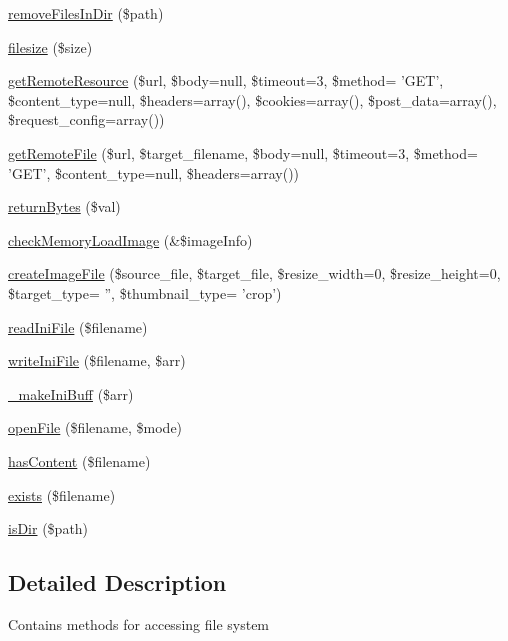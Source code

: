 \begin{DoxyCompactItemize}
\hyperlink{classFileHandler_a07839b4971e9ef40039d23ea65977d69}{remove\+Files\+In\+Dir} (\$path)
\item 
\hyperlink{classFileHandler_ae235b4ded589fb13caed260fabc0a30c}{filesize} (\$size)
\item 
\hyperlink{classFileHandler_a602c039b415c15d9d6866e586282faf7}{get\+Remote\+Resource} (\$url, \$body=null, \$timeout=3, \$method= 'G\+E\+T', \$content\+\_\+type=null, \$headers=array(), \$cookies=array(), \$post\+\_\+data=array(), \$request\+\_\+config=array())
\item 
\hyperlink{classFileHandler_a41e633e2f59cffddd5d5ffae1e3639c7}{get\+Remote\+File} (\$url, \$target\+\_\+filename, \$body=null, \$timeout=3, \$method= 'G\+E\+T', \$content\+\_\+type=null, \$headers=array())
\item 
\hyperlink{classFileHandler_a79dd068137470965b560f4d23d978e7d}{return\+Bytes} (\$val)
\item 
\hyperlink{classFileHandler_a0b240e89b6ce57cb94e855fc25e5e9f3}{check\+Memory\+Load\+Image} (\&\$image\+Info)
\item 
\hyperlink{classFileHandler_a171948d79c14415ad45b7581a011c593}{create\+Image\+File} (\$source\+\_\+file, \$target\+\_\+file, \$resize\+\_\+width=0, \$resize\+\_\+height=0, \$target\+\_\+type= '', \$thumbnail\+\_\+type= 'crop')
\item 
\hyperlink{classFileHandler_a58a8bbae1ab4acb358599db38a47db4d}{read\+Ini\+File} (\$filename)
\item 
\hyperlink{classFileHandler_aa0fd9ce8f2c81bee472a403e75b578bd}{write\+Ini\+File} (\$filename, \$arr)
\item 
\hyperlink{classFileHandler_a8975f9247987757497e0288f3ee09173}{\+\_\+make\+Ini\+Buff} (\$arr)
\item 
\hyperlink{classFileHandler_a690753d8cf8ff837f28a811cdfbfa069}{open\+File} (\$filename, \$mode)
\item 
\hyperlink{classFileHandler_ad872016e83b1f62a03d54e359ce31f73}{has\+Content} (\$filename)
\item 
\hyperlink{classFileHandler_a862c4f6349792ae8f094ec456c9a26ed}{exists} (\$filename)
\item 
\hyperlink{classFileHandler_a5fd371542d6f1a86269d0b8795e74471}{is\+Dir} (\$path)
\end{DoxyCompactItemize}


\subsection{Detailed Description}
Contains methods for accessing file system

